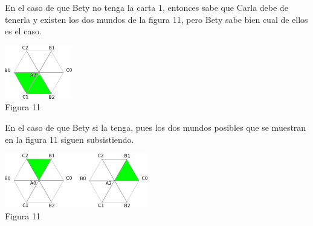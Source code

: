 \documentclass{article}
\begin{document}
\begin{enumerate}
En el caso de que Bety no tenga la carta 1, entonces sabe que Carla debe de tenerla y existen los dos mundos de la figura 11, pero Bety sabe bien cual de ellos es el caso.

\begin{center}
  \includegraphics{figura11a.png}\\
  Figura 11
\end{center}

En el caso de que Bety si la tenga, pues los dos mundos posibles que se muestran en la 
figura 11 siguen subsistiendo.

\begin{center}
  \includegraphics{figura11.png}\\
  Figura 11
\end{center}

\end{enumerate}
\end{document}
